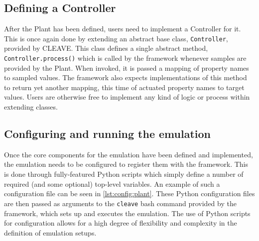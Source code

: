 \subsection{Defining a Controller}

After the Plant has been defined, users need to implement a Controller for it.
This is once again done by extending an abstract base class, \texttt{Controller}, provided by CLEAVE.\@
This class defines a single abstract method, \texttt{Controller.process()} which is called by the framework whenever samples are provided by the Plant.
When invoked, it is passed a mapping of property names to sampled values.
The framework also expects implementations of this method to return yet another mapping, this time of actuated property names to target values.
Users are otherwise free to implement any kind of logic or process within extending classes.

\subsection{Configuring and running the emulation}

Once the core components for the emulation have been defined and implemented, the emulation needs to be configured to register them with the framework.
This is done through fully-featured Python scripts which simply define a number of required (and some optional) top-level variables.
An example of such a configuration file can be seen in \cref{lst:config:plant}.
These Python configuration files are then passed as arguments to the \texttt{cleave} bash command provided by the framework, which sets up and executes the emulation.
The use of Python scripts for configuration allows for a high degree of flexibility and complexity in the definition of emulation setups.

